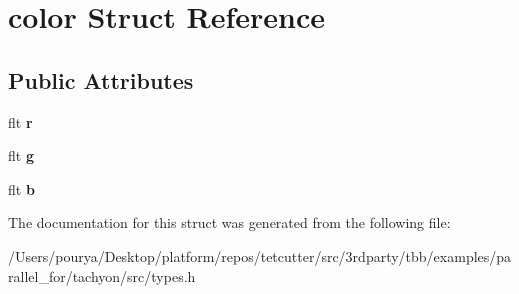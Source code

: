 \hypertarget{structcolor}{}\section{color Struct Reference}
\label{structcolor}
\subsection*{Public Attributes}
\begin{DoxyCompactItemize}
\item 
\hypertarget{structcolor_ac8bd789a1a21547c52712aa15971a9b2}{}flt {\bfseries r}\label{structcolor_ac8bd789a1a21547c52712aa15971a9b2}

\item 
\hypertarget{structcolor_ae638dff61cf8837a64cd2e15166fad67}{}flt {\bfseries g}\label{structcolor_ae638dff61cf8837a64cd2e15166fad67}

\item 
\hypertarget{structcolor_a7d7c5cb6f17fb0e39ea34eb894aef82c}{}flt {\bfseries b}\label{structcolor_a7d7c5cb6f17fb0e39ea34eb894aef82c}

\end{DoxyCompactItemize}


The documentation for this struct was generated from the following file\+:\begin{DoxyCompactItemize}
\item 
/\+Users/pourya/\+Desktop/platform/repos/tetcutter/src/3rdparty/tbb/examples/parallel\+\_\+for/tachyon/src/types.\+h\end{DoxyCompactItemize}
